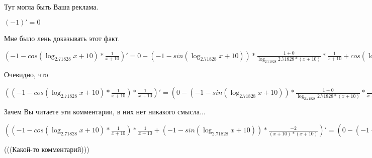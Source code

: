\documentclass[12pt,a4paper,fleqn]{article}
\theoremstyle{definition}
\begin{document}
Тут могла быть Ваша реклама.

$( -1 )' =  0 $

Мне было лень доказывать этот факт.

$( -1  - cos(\log_{ 2.71828 }{ x  +  10 }) * \frac{ 1 }{ x  +  10 }
)' =  0  - ( -1  - sin(\log_{ 2.71828 }{ x  +  10 })) * \frac{ 1  +  0 }{\log_{ 2.71828 }{ 2.71828 } * ( x  +  10 )}
 * \frac{ 1 }{ x  +  10 }
 + cos(\log_{ 2.71828 }{ x  +  10 }) * \frac{ 0  * ( x  +  10 ) -  1  * ( 1  +  0 )}{( x  +  10 ) * ( x  +  10 )}
$

Очевидно, что

$(( -1  - cos(\log_{ 2.71828 }{ x  +  10 }) * \frac{ 1 }{ x  +  10 }
) * \frac{ 1 }{ x  +  10 }
)' = ( 0  - ( -1  - sin(\log_{ 2.71828 }{ x  +  10 })) * \frac{ 1  +  0 }{\log_{ 2.71828 }{ 2.71828 } * ( x  +  10 )}
 * \frac{ 1 }{ x  +  10 }
 + cos(\log_{ 2.71828 }{ x  +  10 }) * \frac{ 0  * ( x  +  10 ) -  1  * ( 1  +  0 )}{( x  +  10 ) * ( x  +  10 )}
) * \frac{ 1 }{ x  +  10 }
 + ( -1  - cos(\log_{ 2.71828 }{ x  +  10 }) * \frac{ 1 }{ x  +  10 }
) * \frac{ 0  * ( x  +  10 ) -  1  * ( 1  +  0 )}{( x  +  10 ) * ( x  +  10 )}
$

Зачем Вы читаете эти комментарии, в них нет никакого смысла...

$(( -1  - cos(\log_{ 2.71828 }{ x  +  10 }) * \frac{ 1 }{ x  +  10 }
) * \frac{ 1 }{ x  +  10 }
 + ( -1  - sin(\log_{ 2.71828 }{ x  +  10 })) * \frac{ -2 }{( x  +  10 ) * ( x  +  10 )}
)' = ( 0  - ( -1  - sin(\log_{ 2.71828 }{ x  +  10 })) * \frac{ 1  +  0 }{\log_{ 2.71828 }{ 2.71828 } * ( x  +  10 )}
 * \frac{ 1 }{ x  +  10 }
 + cos(\log_{ 2.71828 }{ x  +  10 }) * \frac{ 0  * ( x  +  10 ) -  1  * ( 1  +  0 )}{( x  +  10 ) * ( x  +  10 )}
) * \frac{ 1 }{ x  +  10 }
 + ( -1  - cos(\log_{ 2.71828 }{ x  +  10 }) * \frac{ 1 }{ x  +  10 }
) * \frac{ 0  * ( x  +  10 ) -  1  * ( 1  +  0 )}{( x  +  10 ) * ( x  +  10 )}
 + ( 0  - cos(\log_{ 2.71828 }{ x  +  10 }) * \frac{ 1  +  0 }{\log_{ 2.71828 }{ 2.71828 } * ( x  +  10 )}
) * \frac{ -2 }{( x  +  10 ) * ( x  +  10 )}
 + ( -1  - sin(\log_{ 2.71828 }{ x  +  10 })) * \frac{ 0  * ( x  +  10 ) * ( x  +  10 ) -  -2  * (( 1  +  0 ) * ( x  +  10 ) + ( x  +  10 ) * ( 1  +  0 ))}{( x  +  10 ) * ( x  +  10 ) * ( x  +  10 ) * ( x  +  10 )}
$

(((Какой-то комментарий)))
\end{document}
